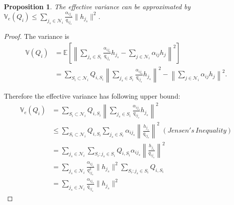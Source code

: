 \documentclass{article}
\newtheorem{proposition}{Proposition}
\begin{document}
\begin{proposition}\label{proposition:mp_var_bound}
The effective variance can be approximated by $\mathbb{V}_e(Q_i) \leq \sum_{j_s \in \mathcal{N}_i} \frac{\alpha_{ij_s}}{q_{ij_s}}\|h_{j_s}\|^2$.
\end{proposition}
\begin{proof}
The variance is
\begin{align*}
\mathbb{V}(Q_i) &= \mathbb{E}\left[\left\|\sum_{j_s\in S_i}\frac{\alpha_{i j_s}}{q_{ij_s}}h_{j_s} - \sum_{j\in\mathcal{N}_i}\alpha_{ij}h_{j} \right\|^2\right] \\
	&= \sum_{S_i\subset\mathcal{N}_i}Q_{i,S_i}\left\|\sum_{j_s\in S_i}\frac{\alpha_{ij_s}}{q_{ij_s}}h_{j_s}\right\|^2 - \left\|\sum_{j\in\mathcal{N}_i}\alpha_{ij} h_{j}\right\|^2.
\end{align*}

Therefore the effective variance has following upper bound:
\begin{align*}
\mathbb{V}_e(Q_{i}) &= \sum_{S_i\subset\mathcal{N}_i}Q_{i,S_i}\left\|\sum_{j_s\in S_i}\frac{\alpha_{ij_s}}{q_{ij_s}}h_{j_s}\right\|^2 \\
	&\leq \sum_{S_i\subset\mathcal{N}_i} Q_{i,S_i}\sum_{j_s\in S_i}\alpha_{ij_s}\left\|\frac{h_{j_s}}{q_{ij_s}}\right\|^2 \;(Jensen's\, Inequality) \\
	&= \sum_{j_s\in\mathcal{N}_i}\sum_{S_i:j_s\in S_i}Q_{i,S_i}\alpha_{ij_s}\left\|\frac{h_{j_s}}{q_{ij_s}}\right\|^2 \\
	&= \sum_{j_s\in\mathcal{N}_i}\frac{\alpha_{ij_s}}{q_{ij_s}^2}\|h_{j_s}\|^2\sum_{S_i:j_s\in S_i}Q_{i,S_i} \\
	&= \sum_{j_s\in\mathcal{N}_i}\frac{\alpha_{ij_s}}{q_{ij_s}}\|h_{j_s}\|^2
\end{align*}
\end{proof}
\end{document}
